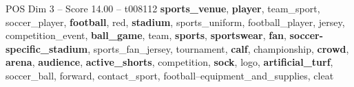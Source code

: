 \begin{textsample}{POS Dim 3 – Score 14.00 – t008112}  \label{ex:f3_pos_035}
\textbf{sports\_venue}, \textbf{player}, team\_sport, soccer\_player, \textbf{football}, red, \textbf{stadium}, sports\_uniform, football\_player, jersey, competition\_event, \textbf{ball\_game}, team, \textbf{sports}, \textbf{sportswear}, \textbf{fan}, \textbf{soccer-specific\_stadium}, sports\_fan\_jersey, tournament, \textbf{calf}, championship, \textbf{crowd}, \textbf{arena}, \textbf{audience}, \textbf{active\_shorts}, competition, \textbf{sock}, logo, \textbf{artificial\_turf}, soccer\_ball, forward, contact\_sport, football--equipment\_and\_supplies, cleat

\end{textsample}
